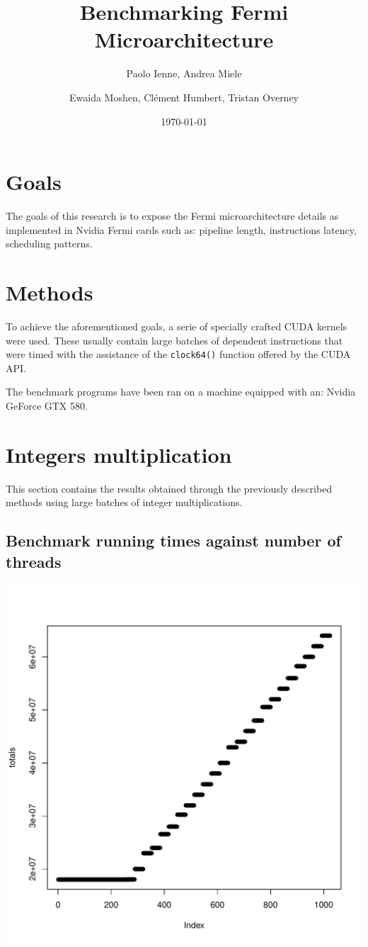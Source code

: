 \documentclass{article}
\begin{document}
\title{Benchmarking Fermi Microarchitecture}
\author{Paolo Ienne, Andrea Miele\and Ewaida Moshen, Cl\'{e}ment Humbert, Tristan Overney}
\date{\today}
\maketitle

\section{Goals}
	The goals of this research is to expose the Fermi microarchitecture details as implemented 
    in Nvidia Fermi cards such as: pipeline length, instructions latency, scheduling patterns.

\section{Methods}
	To achieve the aforementioned goals, a serie of specially crafted CUDA kernels
	were used. These usually contain large batches of dependent instructions that were 
	timed with the assistance of the \texttt{clock64()} function offered by the CUDA API.

	The benchmark programs have been ran on a machine equipped with an: 
	Nvidia GeForce GTX 580.

\section{Integers multiplication}
	This section contains the results obtained through the previously described
	methods using large batches of integer multiplications.

	\subsection{Benchmark running times against number of threads}
	\includegraphics[width=\linewidth]{"graphics/running_times"}
	\pagebreak
\end{document}
